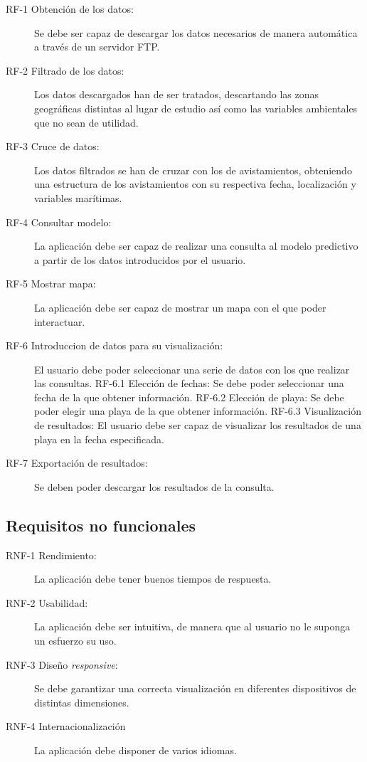 \begin{description}
	\item[RF-1 Obtención de los datos:] Se debe ser capaz de descargar los datos necesarios de manera automática a través de un servidor FTP.
	\item[RF-2 Filtrado de los datos:] Los datos descargados han de ser tratados, descartando las zonas geográficas distintas al lugar de estudio así como las variables ambientales que no sean de utilidad.
	\item[RF-3 Cruce de datos:] Los datos filtrados se han de cruzar con los de avistamientos, obteniendo una estructura de los avistamientos con su respectiva fecha, localización y variables marítimas.	
	\item[RF-4 Consultar modelo:] La aplicación debe ser capaz de realizar una consulta al modelo predictivo a partir de los datos introducidos por el usuario.
	\item[RF-5 Mostrar mapa:] La aplicación debe ser capaz de mostrar un mapa con el que poder interactuar.
	\item[RF-6 Introduccion de datos para su visualización:] El usuario debe poder seleccionar una serie de datos con los que realizar las consultas.
	\subitem RF-6.1 Elección de fechas: Se debe poder seleccionar una fecha de la que obtener información.
	\subitem RF-6.2 Elección de playa: Se debe poder elegir una playa de la que obtener información.
	\subitem RF-6.3 Visualización de resultados: El usuario debe ser capaz de visualizar los resultados de una playa en la fecha especificada.	
	\item[RF-7 Exportación de resultados:] Se deben poder descargar los resultados de la consulta.
\end{description}

	\subsection{Requisitos no funcionales}

\begin{description}
	\item[RNF-1 Rendimiento:] La aplicación debe tener buenos tiempos de respuesta.
	\item[RNF-2 Usabilidad:] La aplicación debe ser intuitiva, de manera que al usuario no le suponga un esfuerzo su uso.
	\item[RNF-3 Diseño \emph{responsive}:] Se debe garantizar una correcta visualización en diferentes dispositivos de distintas dimensiones.
	\item[RNF-4 Internacionalización] La aplicación debe disponer de varios idiomas.
\end{description}


